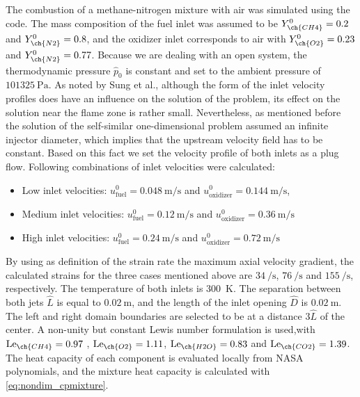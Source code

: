 The combustion of a methane-nitrogen mixture with air was simulated using the \BoSSS code. The mass composition of the fuel inlet was assumed to be  $Y^0_{\ch{CH4}} = 0.2$ and $Y^0_{\ch{N2}} = 0.8$, and the oxidizer inlet corresponds to air with   $Y^0_{\ch{O2}} = 0.23$ and $Y^0_{\ch{N2}} = 0.77$. Because we are dealing with an open system, the thermodynamic pressure $\hat p_0$ is constant and set to the ambient pressure of $\SI{101325}{\pascal}$. As noted by Sung et al., \cite{sungStructuralResponseCounterflow1995} although the form of the inlet velocity profiles does have an influence on the solution of the problem, its effect on the solution near the flame zone is rather small. Nevertheless, as mentioned before the solution of the self-similar one-dimensional problem assumed an infinite injector diameter, which implies that the upstream velocity field has to be constant. Based on this fact we set the velocity profile of both inlets as a plug flow. Following combinations of inlet velocities were calculated:
\begin{itemize}
	\item  Low inlet velocities:  $u^0_{\text{fuel}} = \SI{0.048}{\meter \per \second}$ and  $u^0_{\text{oxidizer}} = \SI{0.144}{\meter \per \second}$,
	\item Medium inlet velocities:  $u^0_{\text{fuel}} = \SI{0.12}{\meter \per \second}$ and  $u^0_{\text{oxidizer}} = \SI{0.36}{\meter \per \second}$
	\item High inlet velocities: $u^0_{\text{fuel}}  = \SI{0.24}{\meter \per \second}$ and   $u^0_{\text{oxidizer}} = \SI{0.72}{\meter \per \second}$
\end{itemize}
By using as definition of the strain rate the maximum axial velocity gradient, the calculated strains for the three cases mentioned above are $\SI{34}{\per\second}$, $\SI{76}{\per\second}$ and $\SI{155}{\per\second}$, respectively. The temperature of both inlets is \SI{300}{\kelvin}. The separation between both jets $\hat L$ is equal to $\SI{0.02}{\meter}$, and the length of the inlet opening $\hat D$ is $\SI{0.02}{\meter}$. The left and right domain boundaries are selected to be at a distance $3\hat L$ of the center. A non-unity but constant Lewis number formulation is used,with  
$\Lewis_{\ch{CH4}} =  0.97 $ , $\Lewis_{\ch{O2}} = 1.11 $, $\Lewis_{\ch{H2O}} = 0.83 $ and $\Lewis_{\ch{CO2}} = 1.39 $.\cite{smookePremixedNonpremixedTest1991} The heat capacity of each component is evaluated locally from NASA polynomials, and the mixture heat capacity is calculated with \cref{eq:nondim_cpmixture}.
